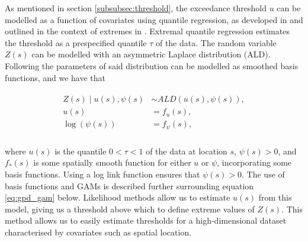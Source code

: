 \documentclass{article}
\numberwithin{equation}{section}
\begin{document}
As mentioned in section \ref{subsubsec:threshold}, the exceedance threshold $u$ can be modelled as a function of covariates using quantile regression, as developed in \citet{Yu2001} and outlined in the context of extremes in \citet{Youngman2019}.
Extremal quantile regression estimates the threshold as a prespecified quantile $\tau$ of the data. 
The random variable $Z(s)$ can be modelled with an asymmetric Laplace distribution (ALD).
Following \citet{Youngman2019} the parameters of said distribution can be modelled as smoothed basis functions, and we have that
\begin{center}
  \begin{align} \label{eq:asymmetric_laplace}
    \begin{split}
      Z(s) \mid u(s), \psi(s) &\sim ALD(u(s), \psi(s)), \\
      u(s) &= f_u(s), \\
      \log(\psi(s)) &= f_{\psi}(s), \\
    \end{split}
  \end{align}
\end{center}
where $u(s)$ is the quantile $0 < \tau < 1$ of the data at location $s$, $\psi(s) > 0$, and $f_*(s)$ is some spatially smooth function for either $u$ or $\psi$, incorporating some basis functions. %
Using a log link function ensures that $\psi(s) > 0$.
The use of basis functions and GAMs is described further surrounding equation \eqref{eq:gpd_gam} below. 
Likelihood methods allow us to estimate $u(s)$ from this model, giving us a threshold above which to define extreme values of $Z(s)$.
This method allows us to easily estimate thresholds for a high-dimensional dataset characterised by covariates such as spatial location.
\end{document}
